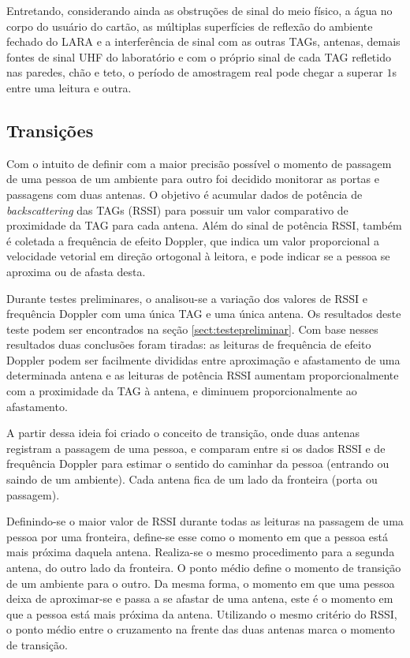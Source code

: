 Entretando, considerando ainda as obstruções de sinal do meio físico, a água no corpo do usuário do cartão, as múltiplas superfícies de reflexão do ambiente fechado do LARA e a interferência de sinal com as outras TAGs, antenas, demais fontes de sinal UHF do laboratório e com o próprio sinal de cada TAG refletido nas paredes, chão e teto, o período de amostragem real pode chegar a superar $1$s entre uma leitura e outra.


 \subsection{Transições}
 
 Com o intuito de definir com a maior precisão possível o momento de passagem de uma pessoa de um ambiente para outro foi decidido monitorar as portas e passagens com duas antenas. O objetivo é acumular dados de potência de \textit{backscattering} das TAGs (RSSI) para possuir um valor comparativo de proximidade da TAG para cada antena. Além do sinal de potência RSSI, também é coletada a frequência de efeito Doppler, que indica um valor proporcional a velocidade vetorial em direção ortogonal à leitora, e pode indicar se a pessoa se aproxima ou de afasta desta.
 
 Durante testes preliminares, o analisou-se a variação dos valores de RSSI e frequência Doppler com uma única TAG e uma única antena. Os resultados deste teste podem ser encontrados na seção \ref{sect:testepreliminar}. Com base nesses resultados duas conclusões foram tiradas: as leituras de frequência de efeito Doppler podem ser facilmente divididas entre aproximação e afastamento de uma determinada antena e as leituras de potência RSSI aumentam proporcionalmente com a proximidade da TAG à antena, e diminuem proporcionalmente ao afastamento.
 
 A partir dessa ideia foi criado o conceito de transição, onde duas antenas registram a passagem de uma pessoa, e comparam entre si os dados RSSI e de frequência Doppler para estimar o sentido do caminhar da pessoa (entrando ou saindo de um ambiente). Cada antena fica de um lado da fronteira (porta ou passagem).
 
 Definindo-se o maior valor de RSSI durante todas as leituras na passagem de uma pessoa por uma fronteira, define-se esse como o momento em que a pessoa está mais próxima daquela antena. Realiza-se o mesmo procedimento para a segunda antena, do outro lado da fronteira. O ponto médio define o momento de transição de um ambiente para o outro. Da mesma forma, o momento em que uma pessoa deixa de aproximar-se e passa a se afastar de uma antena, este é o momento em que a pessoa está mais próxima da antena. Utilizando o mesmo critério do RSSI, o ponto médio entre o cruzamento na frente das duas antenas marca o momento de transição.
 
